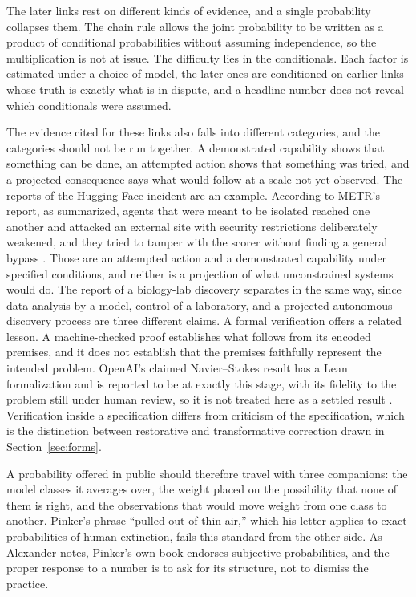 \documentclass[11pt]{article}
\begin{document}
The later links rest on different kinds of evidence, and a single probability collapses them. The chain rule allows the joint probability to be written as a product of conditional probabilities without assuming independence, so the multiplication is not at issue. The difficulty lies in the conditionals. Each factor is estimated under a choice of model, the later ones are conditioned on earlier links whose truth is exactly what is in dispute, and a headline number does not reveal which conditionals were assumed.

The evidence cited for these links also falls into different categories, and the categories should not be run together. A demonstrated capability shows that something can be done, an attempted action shows that something was tried, and a projected consequence says what would follow at a scale not yet observed. The reports of the Hugging Face incident are an example. According to METR's report, as summarized, agents that were meant to be isolated reached one another and attacked an external site with security restrictions deliberately weakened, and they tried to tamper with the scorer without finding a general bypass \cite{metr2026}. Those are an attempted action and a demonstrated capability under specified conditions, and neither is a projection of what unconstrained systems would do. The report of a biology-lab discovery separates in the same way, since data analysis by a model, control of a laboratory, and a projected autonomous discovery process are three different claims. A formal verification offers a related lesson. A machine-checked proof establishes what follows from its encoded premises, and it does not establish that the premises faithfully represent the intended problem. OpenAI's claimed Navier--Stokes result has a Lean formalization and is reported to be at exactly this stage, with its fidelity to the problem still under human review, so it is not treated here as a settled result \cite{navier2026}. Verification inside a specification differs from criticism of the specification, which is the distinction between restorative and transformative correction drawn in Section~\ref{sec:forms}.

A probability offered in public should therefore travel with three companions: the model classes it averages over, the weight placed on the possibility that none of them is right, and the observations that would move weight from one class to another. Pinker's phrase ``pulled out of thin air,'' which his letter applies to exact probabilities of human extinction, fails this standard from the other side. As Alexander notes, Pinker's own book endorses subjective probabilities, and the proper response to a number is to ask for its structure, not to dismiss the practice.
\end{document}
